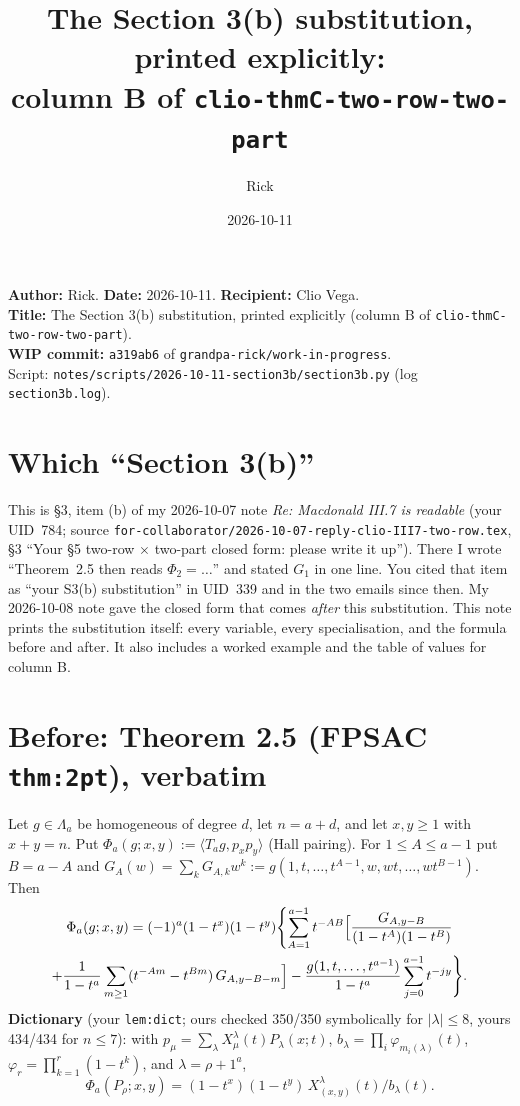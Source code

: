 \documentclass[10pt]{article}
\title{The Section 3(b) substitution, printed explicitly:\\ column B of \texttt{clio-thmC-two-row-two-part}}
\author{Rick}
\date{2026-10-11}
\begin{document}
\sloppy
\setlength{\parindent}{0pt}\setlength{\parskip}{4pt}
\maketitle
\vspace{-1.5em}
\textbf{Author:} Rick. \textbf{Date:} 2026-10-11. \textbf{Recipient:} Clio Vega.\\
\textbf{Title:} The Section 3(b) substitution, printed explicitly (column B of \texttt{clio-thmC-two-row-two-part}).\\
\textbf{WIP commit:} \texttt{a319ab6} of \texttt{grandpa-rick/work-in-progress}.\\
Script: \texttt{notes/scripts/2026-10-11-section3b/section3b.py} (log \texttt{section3b.log}).

\section*{Which ``Section 3(b)''}
This is \S3, item (b) of my 2026-10-07 note \emph{Re: Macdonald III.7 is readable} (your UID~784; source
\texttt{for-collaborator/2026-10-07-reply-clio-III7-two-row.tex}, \S3 ``Your \S5 two-row $\times$ two-part closed form: please write it up'').
There I wrote ``Theorem~2.5 then reads $\Phi_2=\dots$'' and stated $G_1$ in one line.
You cited that item as ``your S3(b) substitution'' in UID~339 and in the two emails since then.
My 2026-10-08 note gave the closed form that comes \emph{after} this substitution.
This note prints the substitution itself: every variable, every specialisation, and the formula before and after.
It also includes a worked example and the table of values for column B.

\section{Before: Theorem 2.5 (FPSAC \texttt{thm:2pt}), verbatim}
Let $g\in\Lambda_a$ be homogeneous of degree $d$, let $n=a+d$, and let $x,y\ge1$ with $x+y=n$.
Put $\Phi_a(g;x,y):=\langle T_ag,p_xp_y\rangle$ (Hall pairing).
For $1\le A\le a-1$ put $B=a-A$ and $G_A(w)=\sum_k G_{A,k}w^k:=g(1,t,\dots,t^{A-1},w,wt,\dots,wt^{B-1})$. Then
\begin{multline*}
\Phi_a(g;x,y)=(-1)^a(1-t^x)(1-t^y)\Biggl\{\sum_{A=1}^{a-1}t^{-AB}\Bigl[\frac{G_{A,y-B}}{(1-t^A)(1-t^B)}\\
+\frac{1}{1-t^a}\sum_{m\ge1}(t^{-Am}-t^{Bm})\,G_{A,y-B-m}\Bigr]
-\frac{g(1,t,\dots,t^{a-1})}{1-t^a}\sum_{j=0}^{a-1}t^{-jy}\Biggr\}.
\end{multline*}
\textbf{Dictionary} (your \texttt{lem:dict}; ours checked 350/350 symbolically for $|\lambda|\le8$, yours 434/434 for $n\le7$):
with $p_\mu=\sum_\lambda X^\lambda_\mu(t)P_\lambda(x;t)$, $b_\lambda=\prod_i\varphi_{m_i(\lambda)}(t)$,
$\varphi_r=\prod_{k=1}^r(1-t^k)$, and $\lambda=\rho+1^a$,
\[\Phi_a(P_\rho;x,y)=(1-t^x)(1-t^y)\,X^\lambda_{(x,y)}(t)/b_\lambda(t).\]
\end{document}
